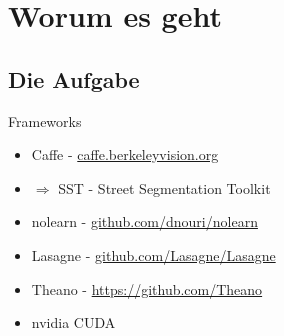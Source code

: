 \section{Worum es geht}

\subsection{Die Aufgabe}


\begin{frame}{Frameworks}
    \begin{itemize}
        \item Caffe - \href{http://caffe.berkeleyvision.org/}{caffe.berkeleyvision.org}
        \item $\Rightarrow$ SST - Street Segmentation Toolkit
        \item nolearn - \href{https://github.com/dnouri/nolearn}{github.com/dnouri/nolearn}
        \item Lasagne - \href{https://github.com/Lasagne/Lasagne}{github.com/Lasagne/Lasagne}
        \item Theano - \href{https://github.com/Theano/Theano}{https://github.com/Theano}
        \item nvidia CUDA
    \end{itemize}
\end{frame}